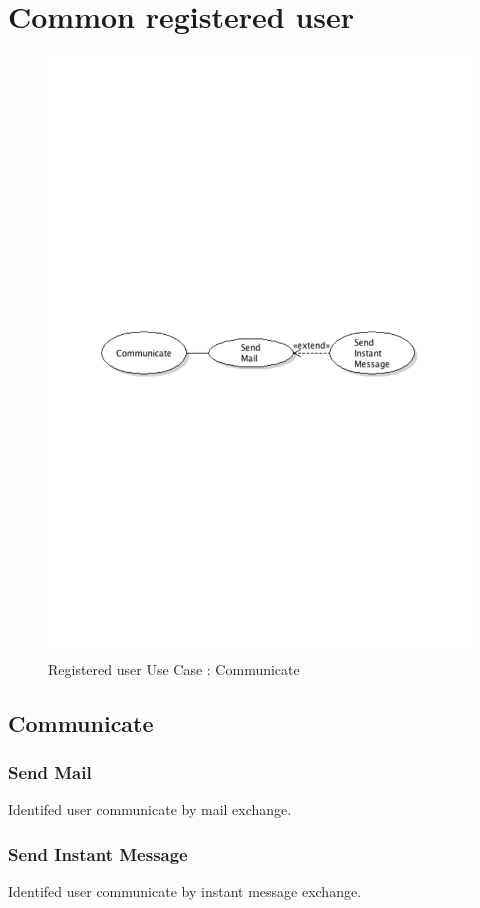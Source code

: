 \section{Common registered user}
	\begin{figure}[ht]
		\begin{center}
			\includegraphics[width=\textwidth,  trim=2cm 12cm 2cm 12cm]{UML_figure/UC/common/UC_Common_Communicate.pdf}
			\caption{Registered user Use Case : Communicate}
		\end{center}
	\end{figure}
	\subsection{Communicate}
		\subsubsection{Send Mail}
			Identifed user communicate by mail exchange.
		\subsubsection{Send Instant Message}
			Identifed user communicate by instant message exchange.













